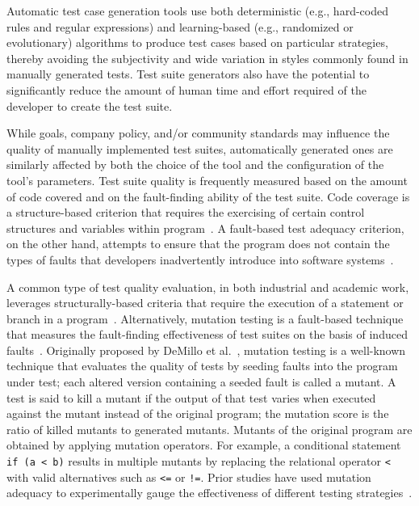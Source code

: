 

Automatic test case generation tools use both deterministic (e.g., hard-coded rules and regular expressions) and
learning-based (e.g., randomized or evolutionary) algorithms to produce test cases based on particular strategies,
thereby avoiding the subjectivity and wide variation in styles commonly found in manually generated tests.  Test suite
generators also have the potential to significantly reduce the amount of human time and effort required of the developer
to create the test suite.  


While goals, company policy, and/or community standards may influence the quality of manually implemented test suites, automatically generated ones are similarly affected by both the choice of the tool and the configuration of the tool's parameters.  Test suite quality is frequently measured based on the amount of code covered and on the fault-finding ability of the test suite.  Code coverage is a structure-based criterion that requires the exercising of certain control structures and variables within program~\cite{kapfhammer-testing-handbook}. A fault-based test adequacy criterion, on the other hand, attempts to ensure that the program does not contain the types of faults that developers inadvertently introduce into software systems~\cite{demillo1978hints}.  


A common type of test quality evaluation, in both industrial and academic work, leverages structurally-based criteria that require the execution of a statement or branch in a program~\cite{weyuker1988evaluation}.  Alternatively, mutation testing is a fault-based technique that measures the fault-finding effectiveness of test suites on the basis of induced faults~\cite{demillo1978hints, hamlet1977testing}.  Originally proposed by DeMillo et al.~\cite{demillo1978hints}, mutation testing is a well-known technique that evaluates the quality of tests by seeding faults into the program under test; each altered version containing a seeded fault is called a mutant. A test is said to kill a mutant if the output of that test varies when executed against the mutant instead of the original program; the mutation score is the ratio of killed mutants to generated mutants. Mutants of the original program are obtained by applying mutation operators. For example, a conditional statement \texttt{if (a < b)} results in multiple mutants by replacing the relational operator \texttt{<} with valid alternatives such as \texttt{<=} or \texttt{!=}. Prior studies have used mutation adequacy to experimentally gauge the effectiveness of different testing strategies~\cite{andrews2005mutation,andrews2006,do2006,just2014}.  

